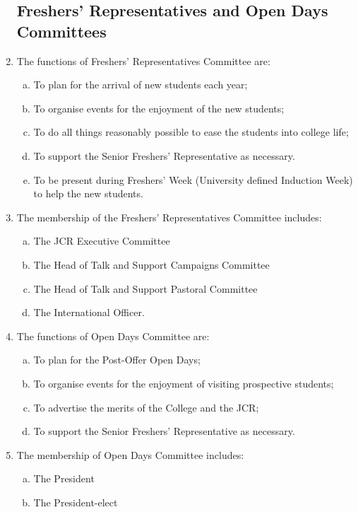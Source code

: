 \documentclass[12pt]{article}  %
\begin{document}
\begin{enumerate}
    \subsection{Freshers’ Representatives and Open Days Committees}
    \item The functions of Freshers’ Representatives Committee are:
    \begin{enumerate}[(a)]
        \item To plan for the arrival of new students each year;
        \item To organise events for the enjoyment of the new students;
        \item To do all things reasonably possible to ease the students into college life;
        \item To support the Senior Freshers’ Representative as necessary.
        \item To be present during Freshers’ Week (University defined Induction Week) to help the new students.
    \end{enumerate}
    \item The membership of the Freshers’ Representatives Committee includes:
    \begin{enumerate}[(a)]
        \item The JCR Executive Committee
        \item The Head of Talk and Support Campaigns Committee
        \item The Head of Talk and Support Pastoral Committee
        \item The International Officer.
    \end{enumerate}
    \item The functions of Open Days Committee are:
    \begin{enumerate}[(a)]
        \item To plan for the Post-Offer Open Days;
        \item To organise events for the enjoyment of visiting prospective students;
        \item To advertise the merits of the College and the JCR;
        \item To support the Senior Freshers’ Representative as necessary.
    \end{enumerate}
    \item The membership of Open Days Committee includes:
    \begin{enumerate}[(a)]
        \item The President
        \item The President-elect

\end{enumerate}
\end{enumerate}
\end{document}
